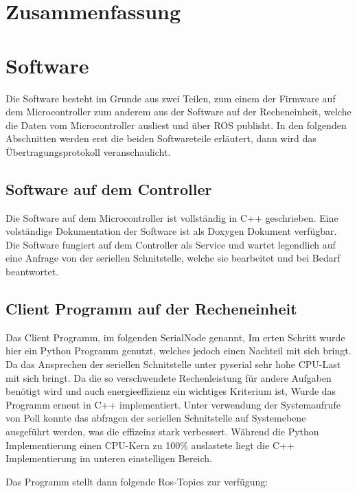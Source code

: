 \section{Zusammenfassung}




\section{Software}

Die Software besteht im Grunde aus zwei Teilen, zum einem der Firmware auf dem Microcontroller zum anderem aus der Software auf der Recheneinheit, welche die Daten vom Microcontroller ausliest und über ROS publisht.
In den folgenden Abschnitten werden erst die beiden Softwareteile erläutert, dann wird das Übertragungsprotokoll veranschaulicht.


\subsection{Software auf dem \textmu Controller}
Die Software auf dem Microcontroller ist vollständig in C++ geschrieben. Eine volständige Dokumentation der Software ist als Doxygen Dokument verfügbar. 
Die Software fungiert auf dem Controller als Service und wartet legendlich auf eine Anfrage von der seriellen Schnitstelle, welche sie bearbeitet und bei Bedarf beantwortet. 


\subsection{Client Programm auf der Recheneinheit}
Das Client Programm, im folgenden SerialNode genannt,
Im erten Schritt wurde hier ein Python Programm genutzt, welches jedoch einen Nachteil mit sich bringt. Da das Ansprechen der seriellen Schnitstelle unter pyserial sehr hohe CPU-Last mit sich bringt.
Da die so verschwendete Rechenleistung für andere Aufgaben benötigt wird und auch energieeffizienz ein wichtiges Kriterium ist, Wurde das Programm erneut in C++ implementiert. Unter verwendung der Systemaufrufe von 
Poll konnte das abfragen der seriellen Schnitstelle auf Systemebene ausgeführt werden, was die effizeinz stark verbessert. Während die Python Implementierung einen CPU-Kern zu 100\%
auslastete liegt die C++ Implementierung im unteren einstelligen Bereich.


 Das Programm stellt dann folgende Ros-Topics zur verfügung:\\
 

